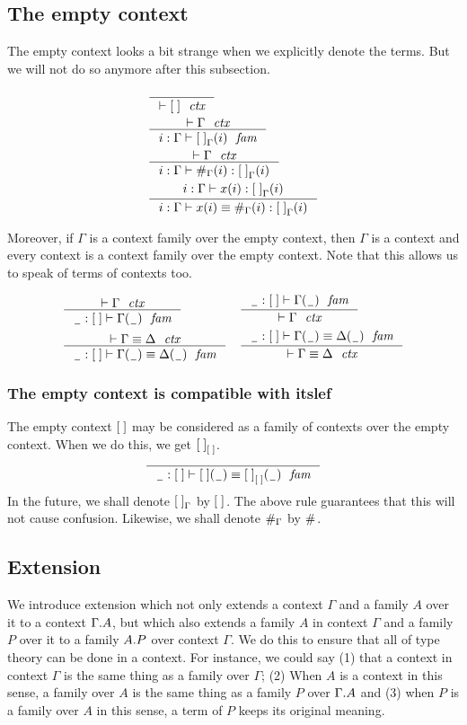\subsection{The empty context}
The empty context looks a bit strange when we explicitly denote the terms. But
we will not do so anymore after this subsection.

\begin{align}
& \inference
  {}
  {\jctx{\emptyc}}\\
& \inference
  {\jctx{\Gamma}}
  {\jvfam{i}{\Gamma}{\emptyf[\Gamma]}}\\
& \inference
  {\jctx{\Gamma}}
  {\jvterm{i}{\Gamma}{\emptyf[\Gamma]}{\emptytm[\Gamma]}}\\
& \inference
  {\jvterm{i}{\Gamma}{\emptyf[\Gamma]}{x}}
  {\jvtermeq{i}{\Gamma}{\emptyf[\Gamma]}{x}{\emptytm[\Gamma]}}
\end{align}

Moreover, if $\Gamma$ is a context family over the
empty context, then $\Gamma$ is a context and every context is a context
family over the empty context. Note that this allows us to speak
of terms of contexts too.

\begin{align}
& \inference
  {\jctx{\Gamma}}
  {\jvfam{\nameless}{\emptyc}{\Gamma}} 
& & \inference
    {\jvfam{\nameless}{\emptyc}{\Gamma}}
    {\jctx{\Gamma}}\\
& \inference
  {\jctxeq{\Gamma}{\Delta}}
  {\jvfameq{\nameless}{\emptyc}{\Gamma}{\Delta}}
& & \inference
    {\jvfameq{\nameless}{\emptyc}{\Gamma}{\Delta}}
    {\jctxeq{\Gamma}{\Delta}}
\end{align}

\subsubsection{The empty context is compatible with itslef}
The empty context $\emptyc$ may be considered as a family of contexts over the empty
context. When we do this, we get $\emptyf[\emptyc]$.
\begin{equation}
\inference
  {}
  {\jvfameq{\nameless}{\emptyc}{\emptyc}{\emptyf[\emptyc]}}
\end{equation}
In the future, we shall denote $\emptyf[\Gamma]$ by $\emptyf$. The above rule
guarantees that this will not cause confusion. Likewise, we shall denote
$\emptytm[\Gamma]$ by $\emptytm$.

\subsection{Extension}
We introduce extension which not only extends a context $\Gamma$ and a family
$A$ over it to a context $\ctxext{\Gamma}{A}$, but which also extends a family $A$
in context $\Gamma$ and a family $P$ over it to a family $\ctxext{A}{P}$ over context
$\Gamma$. We do this to ensure that all of type theory can be done in a context.
For instance, we could say (1) that a context in context $\Gamma$ is the same thing
as a family over $\Gamma$; (2) When $A$ is a context in this sense, a family over
$A$ is the same thing as a family $P$ over $\ctxext{\Gamma}{A}$ and 
(3) when $P$ is a family over $A$ in this sense, a term of $P$ keeps its original meaning.

